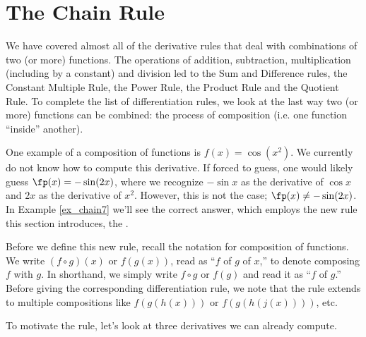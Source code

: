 
\section{The Chain Rule}\label{sec:chainrule}

We have covered almost all of the derivative rules that deal with combinations of two (or more) functions.  The operations of addition, subtraction, multiplication (including by a constant) and division led to the Sum and Difference rules, the Constant Multiple Rule, the Power Rule, the Product Rule and the Quotient Rule.  %
To complete the list of differentiation rules, we look at the last way two (or more) functions can be combined: the process of composition (i.e. one function ``inside''  another).

One example of a composition of functions is $f(x) = \cos(x^2)$. We currently do not know how to compute this derivative. If forced to guess, one would likely guess $\fp(x) = -\sin(2x)$, where we recognize $-\sin x$ as the derivative of $\cos x$ and $2x$ as the derivative of $x^2$. However, this is not the case; $\fp(x)\neq -\sin(2x)$. In Example \ref{ex_chain7} we'll see the correct answer, which employs the new rule this section introduces, the . 

Before we define this new rule, recall the notation for composition of functions. We write $(f \circ g)(x)$ or $f(g(x))$, read as ``$f$ of $g$ of $x$,'' to denote composing $f$ with $g$.  In shorthand, we simply write
$f \circ g$ or $f(g)$ and read it as ``$f$ of $g$.''  Before giving the corresponding differentiation rule, we note that the rule extends to multiple compositions like $f(g(h(x)))$ or $f(g(h(j(x))))$, etc.

To motivate the rule, let's look at three derivatives we can already compute.\\



